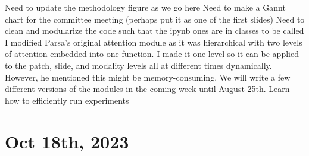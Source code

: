 \documentclass{article}%
\begin{document}
\newline%
%
Need to update the methodology figure as we go here %
\newline%
\newline%
%
Need to make a Gannt chart for the committee meeting (perhaps put it as one of the first slides) %
\newline%
\newline%
%
Need to clean and modularize the code such that the ipynb ones are in classes to be called %
\newline%
\newline%
%
I modified Parsa’s original attention module as it was hierarchical with two levels of attention embedded into one function. I made it one level so it can be applied to the patch, slide, and modality levels all at different times dynamically. However, he mentioned this might be memory{-}consuming. We will write a few different versions of the modules in the coming week until August 25th. %
\newline%
\newline%
%
Learn how to efficiently run experiments %
\newline%
\newline%
%
\section{Oct 18th, 2023}%
\label{sec:Oct18th,2023}%
\end{document}
